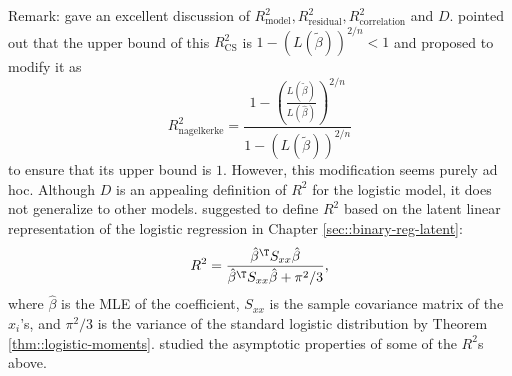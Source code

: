 Remark: \citet{tjur2009coefficients} gave an excellent discussion of $R^2_{\text{model}}   , R^2_{\text{residual}}   , R^2_{\text{correlation}} $ and $D$. \citet{nagelkerke1991note} pointed out that the upper bound of this $R^2_{\text{CS}}$ is $1 - (L(\tilde{\beta}))^{2/n} < 1$ and proposed to modify it as 
$$
R^2_{\text{nagelkerke}} = \frac{ 1 - \left(  \frac{  L(\tilde{\beta}) }{  L(\hat{\beta}) }\right)^{2/n}  }{   1 - \left(    L(\tilde{\beta}) \right)^{2/n}  }
$$
to ensure that its upper bound is $1$. 
However, this modification seems purely ad hoc.
Although $D$ is an appealing definition of $R^2$ for the logistic model, it does not generalize to other models. 
\citet{mckelvey1975statistical} suggested to define $R^2$ based on the latent linear representation of the logistic regression in Chapter \ref{sec::binary-reg-latent}:
$$
R^2 = \frac{ \hat{\beta}^{\T} S_{xx} \hat{\beta} }{  \hat{\beta}^{\T} S_{xx} \hat{\beta} + \pi^2/3},
$$
where $\hat{\beta}$ is the MLE of the coefficient, $S_{xx}$ is the sample covariance matrix of the $x_i$'s, and $\pi^2/3$ is the variance of the standard logistic distribution by Theorem \ref{thm::logistic-moments}. 
\citet{hu2006pseudo} studied the asymptotic properties of some of the $R^2$s above. 
 

